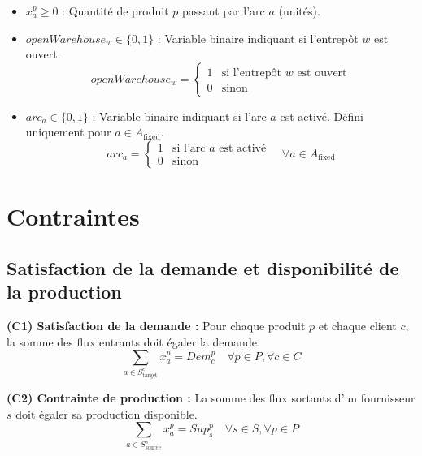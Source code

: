 \documentclass{article}
\begin{document}
\begin{itemize}
    \item $x_a^p \ge 0$ : Quantité de produit $p$ passant par l'arc $a$ (unités).

    \item $openWarehouse_w \in \{0, 1\}$ : Variable binaire indiquant si l'entrepôt $w$ est ouvert.
    \begin{equation*}
        openWarehouse_w = \begin{cases}
            1 & \text{si l'entrepôt } w \text{ est ouvert} \\
            0 & \text{sinon}
        \end{cases}
    \end{equation*}

    \item $arc_a \in \{0, 1\}$ : Variable binaire indiquant si l'arc $a$ est activé.
    \quad Défini uniquement pour $a \in A_{\text{fixed}}$.
    \begin{equation*}
        arc_a = \begin{cases}
            1 & \text{si l'arc } a \text{ est activé} \\
            0 & \text{sinon}
        \end{cases} \quad \forall a \in A_{\text{fixed}}
    \end{equation*}

\end{itemize}

\section{Contraintes}

\subsection{Satisfaction de la demande et disponibilité de la production}

\noindent\textbf{(C1) Satisfaction de la demande :}
Pour chaque produit $p$ et chaque client $c$, la somme des flux entrants doit égaler la demande.
\begin{equation}
    \sum_{a \in S_{\text{target}}^c} x_a^p = Dem_c^p \quad \forall p \in P, \forall c \in C \label{eq:demand}
\end{equation}

\noindent\textbf{(C2) Contrainte de production :}
La somme des flux sortants d'un fournisseur $s$ doit égaler sa production disponible.
\begin{equation}
    \sum_{a \in S_{\text{source}}^s} x_a^p = Sup_s^p \quad \forall s \in S, \forall p \in P \label{eq:supply}
\end{equation}
\end{document}
